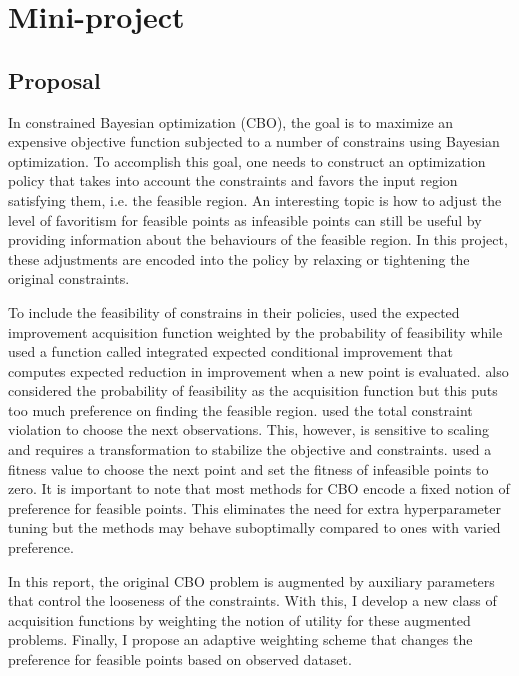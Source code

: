 

\section{Mini-project}
\subsection{Proposal}
In constrained Bayesian optimization (CBO), the goal is to maximize an expensive objective function
subjected to a number of constrains using Bayesian optimization. To accomplish this goal, one needs to construct an optimization policy that takes into account the constraints and favors the input region satisfying them, i.e. the feasible region. An interesting topic is how to adjust the level of favoritism for feasible points as infeasible points can still be useful by providing information about the behaviours of
the feasible region. In this project, these adjustments are encoded into the policy by relaxing or tightening the original constraints.

To include the feasibility of constrains in their policies, \cite{gardner2014bayesian,gelbart2014bayesian} used the expected improvement acquisition function weighted by the probability of feasibility while \cite{bernardo2011optimization} used a function called integrated expected conditional improvement that computes expected reduction in improvement when a new point is evaluated. \cite{gelbart2014bayesian} also considered the probability of feasibility as the acquisition function but this puts too much preference on finding the feasible region. \cite{eriksson2021scalable} used the total constraint violation to choose the next observations. This, however, is sensitive to scaling and requires a transformation to stabilize the objective and constraints. \cite{kramer2010review} used a fitness value to choose the next point and set the fitness of infeasible points to zero. It is important to note that most methods for CBO encode a fixed notion of preference for feasible points. This eliminates the need for extra hyperparameter tuning but the methods may behave suboptimally compared to ones with varied preference.

In this report, the original CBO problem is augmented by auxiliary parameters that control the looseness of the constraints. With this, I develop a new class of acquisition functions by weighting the notion of utility for these augmented problems. Finally, I propose an adaptive weighting scheme that changes the preference for feasible points based on observed dataset.

